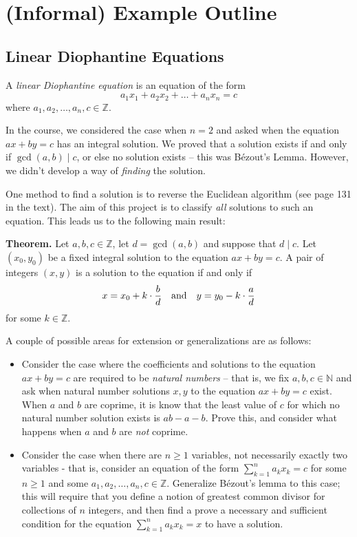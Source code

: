 \documentclass{article}
\begin{document}
\pagebreak


\section*{(Informal) Example Outline}

\subsection*{Linear Diophantine Equations}
    A \textit{linear Diophantine equation} is an equation of the form $$a_{1}x_{1} + a_{2}x_{2} + \dots + a_{n}x_{n} = c$$ where $a_{1}, a_{2}, \dots, a_{n}, c \in \mathbb{Z}$.
    
    \vspace{3mm}
    In the course, we considered the case when $n = 2$ and asked when the equation $ax + by = c$ has an integral solution. We proved that a solution exists if and only if $\gcd(a, b) \mid c$, or else no solution exists -- this was B\'ezout's Lemma. However, we didn't develop a way of \textit{finding} the solution.
    
    \vspace{3mm}
    One method to find a solution is to reverse the Euclidean algorithm (see page 131 in the text). The aim of this project is to classify \textit{all} solutions to such an equation. This leads us to the following main result:
    
    \vspace{3mm}
    \textbf{Theorem.} Let $a, b, c \in \mathbb{Z}$, let $d = \gcd(a, b)$ and suppose that $d \mid c$. Let $(x_{0}, y_{0})$ be a fixed integral solution to the equation $ax + by = c$. A pair of integers $(x, y)$ is a solution to the equation if and only if $$x = x_{0} + k \cdot \frac{b}{d} \text{\quad and\quad} y = y_{0} - k \cdot \frac{a}{d}$$ for some $k \in \mathbb{Z}$.
    
    \vspace{3mm}
    A couple of possible areas for extension or generalizations are as follows:
    \begin{itemize}
        \item Consider the case where the coefficients and solutions to the equation $ax + by = c$ are required to be \textit{natural numbers} -- that is, we fix $a, b, c \in \mathbb{N}$ and ask when natural number solutions $x, y$ to the equation $ax + by = c$ exist. When $a$ and $b$ are coprime, it is know that the least value of $c$ for which no natural number solution exists is $ab - a - b$. Prove this, and consider what happens when $a$ and $b$ are \textit{not} coprime.
        \item Consider the case when there are $n \ge 1$ variables, not necessarily exactly two variables - that is, consider an equation of the form $\sum_{k = 1}^{n} a_{k}x_{k} = c$ for some $n \ge 1$ and some $a_{1}, a_{2}, \dots, a_{n}, c \in \mathbb{Z}$. Generalize B\'ezout's lemma to this case; this will require that you define a notion of greatest common divisor for collections of $n$ integers, and then find a prove a necessary and sufficient condition for the equation $\sum_{k = 1}^{n} a_{k}x_{k} = x$ to have a solution.
    \end{itemize}
\end{document}
